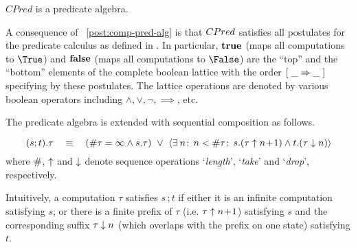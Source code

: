 \begin{Postulate}
  \label{post:comp-pred-alg}
  $CPred$ is a predicate algebra.
\end{Postulate}
%
A consequence of \Post~\ref{post:comp-pred-alg} is that $CPred$
satisfies all postulates for the predicate calculus as defined in
\cite{Dijkstra:1990:PCP:77545}.  In particular, $\mathbf{true}$ (maps all
computations to $\True$) and $\mathbf{false}$ (maps all computations to
$\False$) are the ``top'' and the ``bottom'' elements of the complete
boolean lattice with the order $[\;  \_ \Rightarrow \_ \;]$ specifying by
these postulates.  The lattice operations are denoted by various
boolean operators including $\land, \lor, \neg, \implies$, etc.


The predicate algebra is extended with sequential composition as follows.
%
\begin{Definition}
  \begin{equation}
    \label{eq:comp-seq}
    (s;t).\tau  ~~~\equiv~~~ (\# \tau = \infty \land s.\tau) ~\lor~
    { \langle \exists \:n\!:\, n < \# \tau\!:\, s.(\tau \uparrow n\! + \!1) \land t.(\tau
      \downarrow n) \rangle }
  \end{equation}
%
where $\#$, $\uparrow$ and $\downarrow$ denote sequence operations
`\emph{length}', `\emph{take}' and `\emph{drop}', respectively.
\end{Definition}
Intuitively, a computation $\tau$ satisfies $s\,;t$ if either it is an
infinite computation satisfying $s$, or there is a finite prefix of $\tau$
(i.e. $\tau \uparrow n\! + \!1$) satisfying $s$ and the corresponding suffix $\tau
\downarrow n$ (which overlaps with the prefix on one state) satisfying $t$.  

